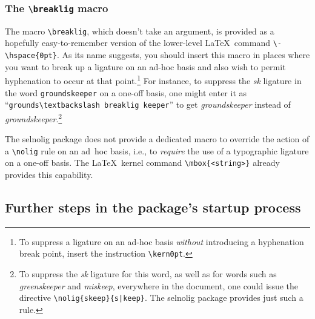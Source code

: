 \documentclass[11pt]{article}
\newcommand{\pkg}[1]{\textsf{#1}}
\newcommand{\cmmd}[1]{\texttt{\textbackslash #1}}
\begin{document}
\subsubsection{The \cmmd{breaklig} macro} 
\label{sec:breaklig}

The macro \cmmd{breaklig}, which doesn't take an argument, is provided as a hopefully easy-to-remember version of the lower-level \LaTeX\ command \Verb+\-\hspace{0pt}+. As its name suggests, you should insert this macro in places where you want to break up a ligature on an ad-hoc basis and also wish to permit hyphenation to occur at that point.\footnote{To suppress a ligature on an ad-hoc basis \emph{without} introducing a hyphenation break point, insert the instruction \cmmd{kern0pt}.} For instance, to suppress the {\ebg\emph{sk}} ligature in the word \Verb+groundskeeper+ on a one-off basis, one might enter it as \enquote{\Verb+grounds\textbackslash breaklig keeper+} to get \emph{\ebg groundskeeper} instead of \emph{\ebg ground\mbox{sk}eeper}.\footnote{To suppress the {\ebg \emph{sk}} ligature for this word, as well as for words such as \emph{\ebg greenskeeper} and \emph{\ebg miskeep}, everywhere in the document, one could issue the directive \Verb+\nolig{skeep}{s|keep}+. The \pkg{selnolig} package provides just such a rule.}


The \pkg{selnolig} package does not provide a dedicated macro to override the action of a \cmmd{nolig} rule on an ad~hoc basis, i.e., to \emph{require} the use of a typographic ligature on a one-off basis. The \LaTeX\ kernel command \Verb+\mbox{<string>}+ already provides this capability.


\subsection{Further steps in the package's startup process}
\end{document}
